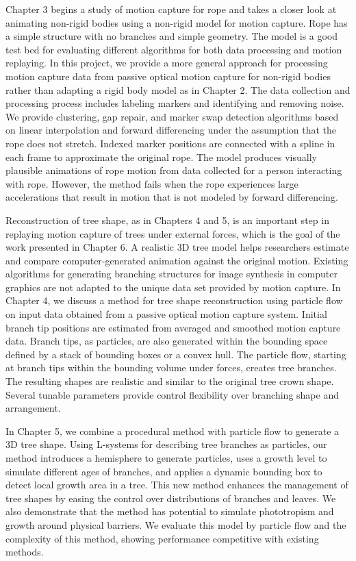 Chapter 3 begins a study of motion capture for rope and takes a closer look at animating non-rigid bodies using a non-rigid model for motion capture. Rope has a simple structure with no branches and simple geometry. The model is a good test bed for evaluating different algorithms for both data processing and motion replaying. In this project, we provide a more general approach for processing motion capture data from passive optical motion capture for non-rigid bodies rather than adapting a rigid body model as in Chapter 2. The data collection and processing process includes labeling markers and identifying and removing noise. We provide clustering, gap repair, and marker swap detection algorithms based on linear interpolation and forward differencing under the assumption that the rope does not stretch. Indexed marker positions are connected with a spline in each frame to approximate the original rope. The model produces visually plausible animations of rope motion from data collected for a person interacting with rope. However, the method fails when the rope experiences large accelerations that result in motion that is not modeled by forward differencing.

Reconstruction of tree shape, as in Chapters 4 and 5, is an important step in replaying motion capture of trees under external forces, which is the goal of the work presented in Chapter 6. A realistic 3D tree model helps researchers estimate and compare computer-generated animation against the original motion. Existing algorithms for generating branching structures for image synthesis in computer graphics are not adapted to the unique data set provided by motion capture. In Chapter 4, we discuss a method for tree shape reconstruction using particle flow on input data obtained from a passive optical motion capture system. Initial branch tip positions are estimated from averaged and smoothed motion capture data. Branch tips, as particles, are also generated within the bounding space defined by a stack of bounding boxes or a convex hull. The particle flow, starting at branch tips within the bounding volume under forces, creates tree branches. The resulting shapes are realistic and similar to the original tree crown shape. Several tunable parameters provide control flexibility over branching shape and arrangement.

In Chapter 5, we combine a procedural method with particle flow to generate a 3D tree shape. Using L-systems for describing tree branches as particles, our method introduces a hemisphere to generate particles, uses a growth level to simulate different ages of branches, and applies a dynamic bounding box to detect local growth area in a tree. This new method enhances the management of tree shapes by easing the control over distributions of branches and leaves. We also demonstrate that the method has potential to simulate phototropism and growth around physical barriers. We evaluate this model by particle flow and the complexity of this method, showing performance competitive with existing methods.

